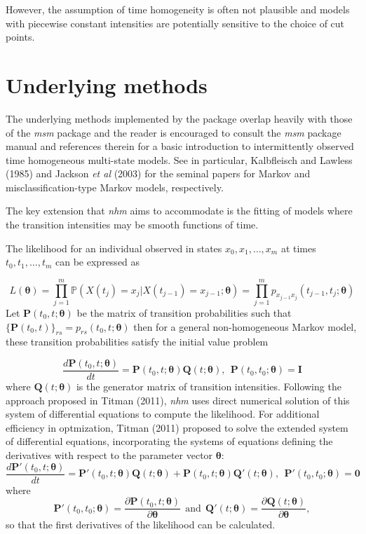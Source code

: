 \documentclass{article}
\numberwithin{equation}{section}
\begin{document}
However, the assumption of time homogeneity is often not plausible and models with piecewise constant intensities are potentially sensitive to the choice of cut points.  



\section{Underlying methods}

The underlying methods implemented by the package overlap heavily with those of the {\it msm} package \cite{jackson} and the reader is encouraged to consult the {\it msm} package manual and references therein for a basic introduction to intermittently observed time homogeneous multi-state models. See in particular, Kalbfleisch and Lawless (1985) \cite{kalbfleisch} and Jackson {\it et al} (2003) \cite{jackson2003} for the seminal papers for Markov and misclassification-type Markov models, respectively.

The key extension that {\it nhm} aims to accommodate is the fitting of models where the transition intensities may be smooth functions of time.

The likelihood for an individual observed in states $x_0, x_1, \ldots, x_m$ at times $t_0, t_1, \ldots, t_m$ can be expressed as

$$L(\bm\theta) = \prod_{j=1}^{m} \mathbb{P}(X(t_j) = x_j | X(t_{j-1}) = x_{j-1} ; \bm\theta) = \prod_{j=1}^{m} p_{x_{j-1}x_j}(t_{j-1},t_j ; \bm\theta)$$
Let $\mathbf{P}(t_0, t ; \bm\theta)$ be the matrix of transition probabilities such that $\{\mathbf{P}(t_0, t)\}_{rs} = p_{rs}(t_0,t ; \bm\theta)$ then for a general non-homogeneous Markov model, these transition probabilities satisfy the initial value problem

$$\frac{d\mathbf{P}(t_0, t ; \bm\theta)}{dt} = \mathbf{P}(t_0, t ; \bm\theta)\mathbf{Q}(t ; \bm\theta), ~~ \mathbf{P}(t_0, t_0 ;\bm\theta) = \mathbf{I}$$
where $\mathbf{Q}(t ; \bm\theta)$ is the generator matrix of transition intensities. Following the approach proposed in Titman (2011), {\it nhm} uses direct numerical solution of this system of differential equations to compute the likelihood. For additional efficiency in optmization, Titman (2011) proposed to solve the extended system of differential equations, incorporating the systems of equations defining the derivatives with respect to the parameter vector $\bm\theta$:
$$\frac{d\mathbf{P}'(t_0, t ; \bm\theta)}{dt} = \mathbf{P}'(t_0, t ; \bm\theta)\mathbf{Q}(t ; \bm\theta) + \mathbf{P}(t_0, t ; \bm\theta)\mathbf{Q}'(t ; \bm\theta), ~~ \mathbf{P}'(t_0, t_0 ;\bm\theta) = \mathbf{0}$$
where $$\mathbf{P}'(t_0, t_0 ;\bm\theta) = \frac{\partial \mathbf{P}(t_0, t ; \bm\theta)}{\partial \bm\theta} ~~ \mbox{and} ~~ \mathbf{Q}'(t ; \bm\theta) = \frac{\partial \mathbf{Q}(t ; \bm\theta)}{\partial \bm\theta},$$
so that the first derivatives of the likelihood can be calculated.
\end{document}
